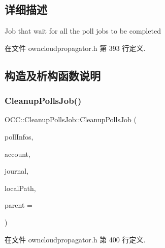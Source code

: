 \subsection{详细描述}
Job that wait for all the poll jobs to be completed 

在文件 owncloudpropagator.\+h 第 393 行定义.



\subsection{构造及析构函数说明}
\mbox{\label{class_o_c_c_1_1_cleanup_polls_job_a7c5e8ccb57d86ddf3bedf8759565a6a5}} 
\subsubsection{\texorpdfstring{Cleanup\+Polls\+Job()}{CleanupPollsJob()}}
{\footnotesize\ttfamily O\+C\+C\+::\+Cleanup\+Polls\+Job\+::\+Cleanup\+Polls\+Job (\begin{DoxyParamCaption}\item[{const Q\+Vector$<$ \hyperlink{struct_o_c_c_1_1_sync_journal_db_1_1_poll_info}{Sync\+Journal\+Db\+::\+Poll\+Info} $>$ \&}]{poll\+Infos,  }\item[{\hyperlink{namespace_o_c_c_a848616aedb9188e223c6b9867757fe69}{Account\+Ptr}}]{account,  }\item[{\hyperlink{class_o_c_c_1_1_sync_journal_db}{Sync\+Journal\+Db} $\ast$}]{journal,  }\item[{const Q\+String \&}]{local\+Path,  }\item[{Q\+Object $\ast$}]{parent = {} }\end{DoxyParamCaption})\hspace{0.3cm}{\ttfamily [explicit]}}



在文件 owncloudpropagator.\+h 第 400 行定义.

\mbox{\label{class_o_c_c_1_1_cleanup_polls_job_ab2f79c25bd90b80e79254d93069c3387}} 
